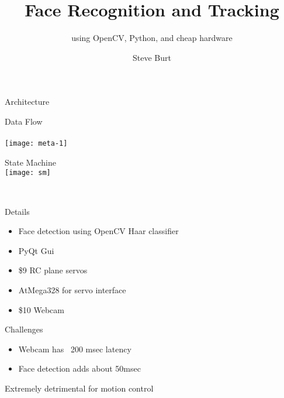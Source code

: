 \documentclass{beamer}
\title{Face Recognition and Tracking}
\subtitle{using OpenCV, Python, and cheap hardware}
\author{Steve Burt}
\begin{document}
\begin{frame}[plain]
\titlepage
\end{frame}
\begin{frame}{Architecture}

\centering
\parbox{.45\textwidth}{  Data Flow\\ \\
\texttt{[image: meta-1]}}\parbox{.5\textwidth}{ State Machine\\\texttt{[image: sm]}}\\
\end{frame}
\begin{frame}{Details}

\begin{itemize}
  \item Face detection using OpenCV Haar classifier
  \item PyQt Gui
\item \$9 RC plane servos
\item AtMega328 for servo interface
\item \$10 Webcam
\end{itemize}
\end{frame}
\begin{frame}{Challenges}
\begin{itemize}
\item Webcam has ~200 msec latency
\item Face detection adds about 50msec
\end{itemize}
Extremely detrimental for motion control
\end{frame}
\end{document}
